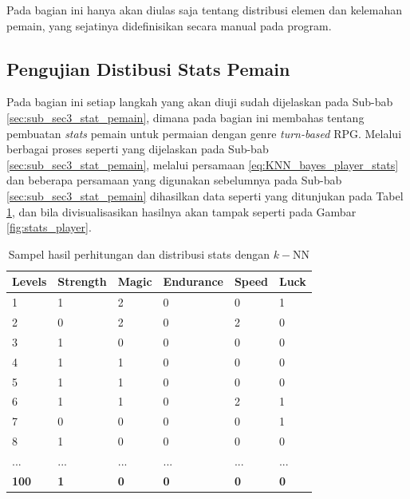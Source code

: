 Pada bagian ini hanya akan diulas saja tentang distribusi elemen dan kelemahan pemain, yang sejatinya didefinisikan secara manual pada program.
\vspace{1ex}

\subsection{Pengujian Distibusi Stats Pemain}
\label{sec:sub_sec4_eval_single-character_stats}
\vspace{1ex}

Pada bagian ini setiap langkah yang akan diuji sudah dijelaskan pada Sub-bab \ref{sec:sub_sec3_stat_pemain}, dimana pada bagian ini membahas tentang pembuatan \textit{stats} pemain untuk permaian dengan genre \textit{turn-based} RPG. Melalui berbagai proses seperti yang dijelaskan pada Sub-bab \ref{sec:sub_sec3_stat_pemain}, melalui persamaan \ref{eq:KNN_bayes_player_stats} dan beberapa persamaan yang digunakan sebelumnya pada Sub-bab \ref{sec:sub_sec3_stat_pemain} dihasilkan data seperti yang ditunjukan pada Tabel \ref{tb:player_battle_stats}, dan bila divisualisasikan hasilnya akan tampak seperti pada Gambar \ref{fig:stats_player}.
\vspace{-1ex}

\begin{longtable}{|l|l|l|l|l|l|}
	\caption{Sampel hasil perhitungan dan distribusi stats dengan $k-$NN}
	\label{tb:player_battle_stats}\\
	\hline
	\rowcolor[HTML]{C0C0C0} 
	\textbf{Levels} & \textbf{Strength} & \textbf{Magic} & \textbf{Endurance} & \textbf{Speed} & \textbf{Luck} \\ \hline
	1 & 1 & 2 & 0 & 0 & 1 \\ \hline
	2 & 0 & 2 & 0 & 2 & 0 \\ \hline
	3 & 1 & 0 & 0 & 0 & 0 \\ \hline
	4 & 1 & 1 & 0 & 0 & 0 \\ \hline
	5 & 1 & 1 & 0 & 0 & 0 \\ \hline
	6 & 1 & 1 & 0 & 2 & 1 \\ \hline
	7 & 0 & 0 & 0 & 0 & 1 \\ \hline
	8 & 1 & 0 & 0 & 0 & 0 \\ \hline
	... & ... & ... & ... & ... & ... \\ \hline
	\textbf{100} & \textbf{1} & \textbf{0} & \textbf{0} & \textbf{0} & \textbf{0} \\ \hline
\end{longtable}

